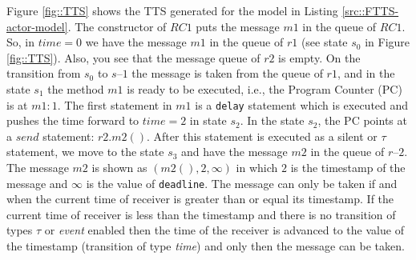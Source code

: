 Figure \ref{fig::TTS} shows the TTS generated for the model in Listing \ref{src::FTTS-actor-model}. 
The constructor of $RC1$ puts the message $m1$ in the queue of $RC1$. So, in $time=0$ we have the message $m1$ in the queue of $r1$ (see state $s_0$ in Figure \ref{fig::TTS}). Also, you see that the message queue of $r2$ is empty. On the transition from $s_0$ to $s–1$ the message is taken from the queue of $r1$, and in the state $s_1$ the method $m1$ is ready to be executed, i.e., the Program Counter (PC) is at $m1:1$. The first statement in $m1$ is a \texttt{delay} statement which is executed and pushes the time forward to $time=2$ in state $s_2$.
In the state $s_2$, the PC points at a $send$ statement: $r2.m2()$. After this statement is executed as a silent or $\tau$ statement, we move to the state $s_3$ and have the message $m2$ in the queue of $r–2$. The message $m2$ is shown as $(m2(), 2, \infty)$ in which $2$ is the timestamp of the message and $\infty$ is the value of \texttt{deadline}. The message can only be taken if and when the current time of receiver is greater than or equal its timestamp. If the current time of receiver is less than the timestamp and there is no transition of types  $\tau$  or \textit{event} enabled then the time of the receiver is advanced to the value of the timestamp (transition of type \textit{time}) and only then the message can be taken.

